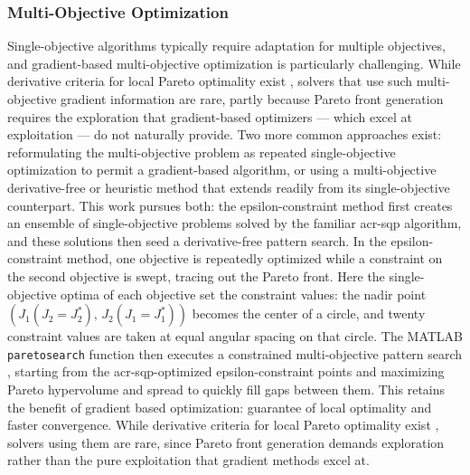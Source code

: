 

\subsubsection{Multi-Objective Optimization}\label{remdo:sec:multi-obj-process}
Single-objective algorithms typically require adaptation for multiple objectives, and gradient-based multi-objective optimization is particularly challenging.
\ifdefined\DISSERTATION
    While derivative criteria for local Pareto optimality exist \citep{desideri_multiple-gradient_2012}, solvers that use such multi-objective gradient information are rare, partly because Pareto front generation requires the exploration that gradient-based optimizers --- which excel at exploitation --- do not naturally provide.
    Two more common approaches exist: reformulating the multi-objective problem as repeated single-objective optimization to permit a gradient-based algorithm, or using a multi-objective derivative-free or heuristic method that extends readily from its single-objective counterpart.
    This work pursues both: the epsilon-constraint method first creates an ensemble of single-objective problems solved by the familiar \gls{acr-sqp} algorithm, and these solutions then seed a derivative-free pattern search.
    In the epsilon-constraint method, one objective is repeatedly optimized while a constraint on the second objective is swept, tracing out the Pareto front.
    Here the single-objective optima of each objective set the constraint values: the nadir point $(J_1(J_2=J_2^*),\, J_2(J_1=J_1^*))$ becomes the center of a circle, and twenty constraint values are taken at equal angular spacing on that circle.
    The MATLAB \texttt{paretosearch} function then executes a constrained multi-objective pattern search \citep{custodio_direct_2011}, starting from the \gls{acr-sqp}-optimized epsilon-constraint points and maximizing Pareto hypervolume and spread to quickly fill gaps between them.
    This retains the benefit of gradient based optimization: guarantee of local optimality and faster convergence.
\else
    While derivative criteria for local Pareto optimality exist \citep{desideri_multiple-gradient_2012},
    solvers using them are rare, since Pareto front generation demands exploration rather than the pure exploitation that gradient methods excel at.
